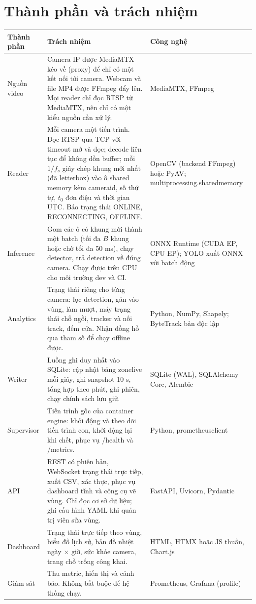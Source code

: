 \documentclass[10pt,a4paper,oneside,openany]{report}
\newcommand{\breakus}{\textunderscore\allowbreak}
\newcommand{\code}[1]{{\ttfamily\let\_\breakus #1}}
\newcommand{\tabhead}[1]{\textsf{\bfseries\color{ink}#1}}
\newenvironment{bang}{\par\small\rowcolors{2}{rowgray}{white}}{\par\vspace{0.3em}}
\begin{document}
\section{Thành phần và trách nhiệm}
\begin{bang}
\begin{xltabular}{\linewidth}{L{26mm}Y L{40mm}}
\toprule
\tabhead{Thành phần} & \tabhead{Trách nhiệm} & \tabhead{Công nghệ} \\
\midrule
\endhead
Nguồn video & Camera IP được MediaMTX kéo về (proxy) để chỉ có một kết nối tới camera. Webcam và file MP4 được FFmpeg đẩy lên. Mọi reader chỉ đọc RTSP từ MediaMTX, nên chỉ có một kiểu nguồn cần xử lý. & MediaMTX, FFmpeg \\
Reader & Mỗi camera một tiến trình. Đọc RTSP qua TCP với timeout mở và đọc; decode liên tục để không dồn buffer; mỗi $1/f_s$ giây chép khung mới nhất (đã letterbox) vào ô shared memory kèm \code{camera\_id}, số thứ tự, $t_0$ đơn điệu và thời gian UTC. Báo trạng thái \code{ONLINE}, \code{RECONNECTING}, \code{OFFLINE}. & OpenCV (backend FFmpeg) hoặc PyAV; \code{multiprocessing.shared\_memory} \\
Inference & Gom các ô có khung mới thành một batch (tối đa $B$ khung hoặc chờ tối đa 50 ms), chạy detector, trả detection về đúng camera. Chạy được trên CPU cho môi trường dev và CI. & ONNX Runtime (CUDA EP, CPU EP); YOLO xuất ONNX với batch động \\
Analytics & Trạng thái riêng cho từng camera: lọc detection, gán vào vùng, làm mượt, máy trạng thái chỗ ngồi, tracker và nối track, đếm cửa. Nhận đồng hồ qua tham số để chạy offline được. & Python, NumPy, Shapely; ByteTrack bản độc lập \\
Writer & Luồng ghi duy nhất vào SQLite: cập nhật bảng \code{zone\_live} mỗi giây, ghi snapshot 10 s, tổng hợp theo phút, ghi phiên, chạy chính sách lưu giữ. & SQLite (WAL), SQLAlchemy Core, Alembic \\
Supervisor & Tiến trình gốc của container engine: khởi động và theo dõi tiến trình con, khởi động lại khi chết, phục vụ \code{/health} và \code{/metrics}. & Python, \code{prometheus\_client} \\
API & REST có phiên bản, WebSocket trạng thái trực tiếp, xuất CSV, xác thực, phục vụ dashboard tĩnh và công cụ vẽ vùng. Chỉ đọc cơ sở dữ liệu; ghi cấu hình YAML khi quản trị viên sửa vùng. & FastAPI, Uvicorn, Pydantic \\
Dashboard & Trạng thái trực tiếp theo vùng, biểu đồ lịch sử, bản đồ nhiệt ngày × giờ, sức khỏe camera, trang chỗ trống công khai. & HTML, HTMX hoặc JS thuần, Chart.js \\
Giám sát & Thu metric, hiển thị và cảnh báo. Không bắt buộc để hệ thống chạy. & Prometheus, Grafana (profile) \\
\bottomrule
\end{xltabular}
\end{bang}
\end{document}
